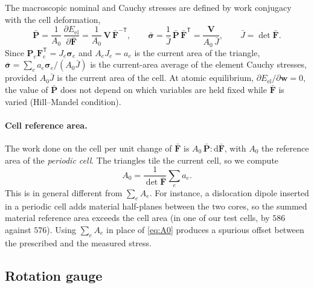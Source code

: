 \documentclass[11pt,a4paper]{article}
\newcommand{\Fb}{\bar{\mathbf F}}
\newcommand{\Pb}{\bar{\mathbf P}}
\newcommand{\sigb}{\bar{\bm\sigma}}
\newcommand{\F}{\mathbf F}
\newcommand{\Pk}{\mathbf P}
\newcommand{\w}{\mathbf w}
\begin{document}
The macroscopic nominal and Cauchy stresses are defined by work conjugacy with the cell
deformation,
\begin{equation}
  \Pb=\frac{1}{A_0}\,\frac{\partial E_{\mathrm{el}}}{\partial\Fb}
     =\frac{1}{A_0}\,\mathbf V\,\Fb^{-\mathsf T},\qquad
  \sigb=\frac{1}{\bar J}\,\Pb\,\Fb^{\mathsf T}=\frac{\mathbf V}{A_0\,\bar J},
  \qquad \bar J=\det\Fb .
  \label{eq:macrostress}
\end{equation}
Since \(\Pk_e\F_e^{\mathsf T}=J_e\bm\sigma_e\) and \(A_eJ_e=a_e\) is the current area of the
triangle, \(\sigb=\sum_e a_e\bm\sigma_e/(A_0\bar J)\) is the current-area average of the element
Cauchy stresses, provided \(A_0\bar J\) is the current area of the cell. At atomic equilibrium,
\(\partial E_{\mathrm{el}}/\partial\w=0\), the value of \(\Pb\) does not depend on which variables
are held fixed while \(\Fb\) is varied (Hill--Mandel condition).

\paragraph{Cell reference area.}
The work done on the cell per unit change of \(\Fb\) is \(A_0\,\Pb:\mathrm d\Fb\), with \(A_0\) the
reference area of the \emph{periodic cell}. The triangles tile the current cell, so we compute
\begin{equation}
  A_0=\frac{1}{\det\Fb}\sum_e a_e .
  \label{eq:A0}
\end{equation}
This is in general different from \(\sum_e A_e\). For instance, a dislocation dipole inserted in a
periodic cell adds material half-planes between the two cores, so the summed material reference
area exceeds the cell area (in one of our test cells, by \(586\) against \(576\)). Using
\(\sum_eA_e\) in place of \eqref{eq:A0} produces a spurious offset between the prescribed and the
measured stress.

\subsection{Rotation gauge}
\end{document}
